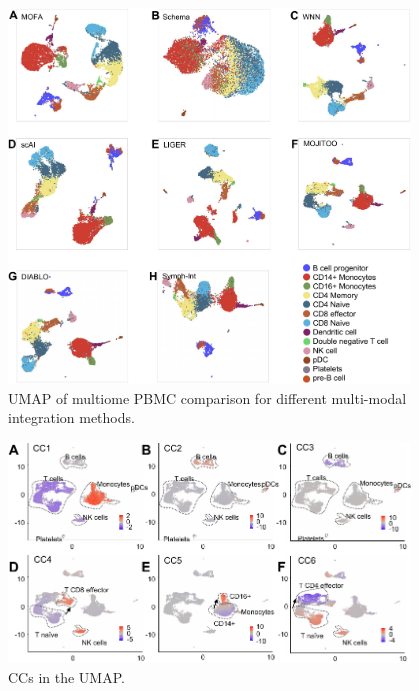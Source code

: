 \begin{figure}[!ht]
	\centering
	\includegraphics[width=0.95\textwidth]{pbmc_multiome_umap/fig}
	\vspace{0.1cm}
	\caption[UMAP of multiome PBMC comparison for different multi-modal integration methods.]{UMAP of multiome PBMC comparison for different multi-modal integration methods.}
	\label{fig:pbmc_multiome_umap}
\end{figure}


\begin{figure}[!ht]
	\centering
	\includegraphics[width=0.95\textwidth]{CC_UMAP/fig}
	\vspace{0.1cm}
	\caption[CCs in the UMAP.]{CCs in the UMAP.}
	\label{fig:CC_UMAP}
\end{figure}


